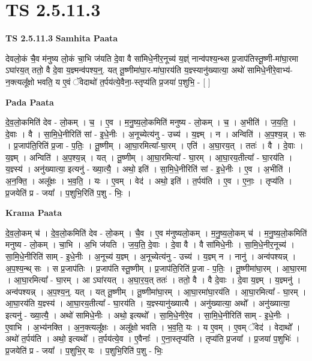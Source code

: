 \documentclass[17pt]{extarticle}
\begin{document}
\section{ TS 2.5.11.3 }

\textbf{TS 2.5.11.3 } \newline
\textbf{Samhita Paata} \newline

देवलो॒कं चै॒व म॑नुष्य लो॒कं चा॒भि ज॑यति दे॒वा वै सा॑मिधे॒नीर॒नूच्य॑ य॒ज्ञ्ं नान्व॑पश्य॒न्थ्स प्र॒जाप॑तिस्तू॒ष्णी-मा॑घा॒रमा ऽघा॑रय॒त् ततो॒ वै दे॒वा य॒ज्ञ्मन्व॑पश्य॒न्॒. यत् तू॒ष्णीमा॑घा॒र-मा॑घा॒रय॑ति य॒ज्ञ्स्यानु॑ख्यात्या॒ अथो॑ सामिधे॒नीरे॒वाभ्य॑-न॒क्त्यलू᳚क्षो भवति॒ य ए॒वं ॅवेदाथो॑ त॒र्पय॑त्ये॒वैना॒-स्तृप्य॑ति प्र॒जया॑ प॒शुभि॒ - [  ] \newline

\textbf{Pada Paata} \newline

दे॒व॒लो॒कमिति॑ देव - लो॒कम् । च॒ । ए॒व । म॒नु॒ष्य॒लो॒कमिति॑ मनुष्य - लो॒कम् । च॒ । अ॒भीति॑ । ज॒य॒ति॒ । दे॒वाः । वै । सा॒मि॒धे॒नीरिति॑ सां - इ॒धे॒नीः । अ॒नूच्येत्य॑नु - उच्य॑ । य॒ज्ञ्म् । न । अन्विति॑ । अ॒प॒श्य॒न्न् । सः । प्र॒जाप॑ति॒रिति॑ प्र॒जा - प॒तिः॒ । तू॒ष्णीम् । आ॒घा॒रमित्या᳚-घा॒रम् । एति॑ । अ॒घा॒रय॒त् । ततः॑ । वै । दे॒वाः । य॒ज्ञ्म् । अन्विति॑ । अ॒प॒श्य॒न्न् । यत् । तू॒ष्णीम् । आ॒घा॒रमित्या᳚ - घा॒रम् । आ॒घा॒रय॒तीत्या᳚ - घा॒रय॑ति । य॒ज्ञ्स्य॑ । अनु॑ख्यात्या॒ इत्यनु॑ - ख्या॒त्यै॒ । अथो॒ इति॑ । सा॒मि॒धे॒नीरिति॑ सां - इ॒धे॒नीः । ए॒व । अ॒भीति॑ । अ॒न॒क्ति॒ । अलू᳚क्षः । भ॒व॒ति॒ । यः । ए॒वम् । वेद॑ । अथो॒ इति॑ । त॒र्पय॑ति । ए॒व । ए॒नाः॒ । तृप्य॑ति । प्र॒जयेति॑ प्र - जया᳚ । प॒शुभि॒रिति॑ प॒शु - भिः॒ ।  \newline


\textbf{Krama Paata} \newline

दे॒व॒लो॒कम् च॑ । दे॒व॒लो॒कमिति॑ देव - लो॒कम् । चै॒व । ए॒व म॑नुष्यलो॒कम् । म॒नु॒ष्य॒लो॒कम् च॑ । म॒नु॒ष्य॒लो॒कमिति॑ मनुष्य - लो॒कम् । चा॒भि । अ॒भि ज॑यति । ज॒य॒ति॒ दे॒वाः । दे॒वा वै । वै सा॑मिधे॒नीः । सा॒मि॒धे॒नीर॒नूच्य॑ । सा॒मि॒धे॒नीरिति॑ साम् - इ॒धे॒नीः । अ॒नूच्य॑ य॒ज्ञ्म् । अ॒नूच्येत्य॑नु - उच्य॑ । य॒ज्ञ्म् न । नानु॑ । अन्व॑पश्यन्न् । अ॒प॒श्य॒न्थ् सः । स प्र॒जाप॑तिः । प्र॒जाप॑ति स्तू॒ष्णीम् । प्र॒जाप॑ति॒रिति॑ प्र॒जा - प॒तिः॒ । तू॒ष्णीमा॑घा॒रम् । आ॒घा॒रमा । आ॒घा॒रमित्या᳚ - घा॒रम् । आ ऽघा॑रयत् । अ॒घा॒र॒य॒त् ततः॑ । ततो॒ वै । वै दे॒वाः । दे॒वा य॒ज्ञ्म् । य॒ज्ञ्मनु॑ । अन्व॑पश्यन्न् । अ॒प॒श्य॒न्॒. यत् । यत् तू॒ष्णीम् । तू॒ष्णीमा॑घा॒रम् । आ॒घा॒रमा॑घा॒रय॑ति । आ॒घा॒रमित्या᳚ - घा॒रम् । आ॒घा॒रय॑ति य॒ज्ञ्स्य॑ । आ॒घा॒रय॒तीत्या᳚ - घा॒रय॑ति । य॒ज्ञ्स्यानु॑ख्यात्यै । अनु॑ख्यात्या॒ अथो᳚ । अनु॑ख्यात्या॒ इत्यनु॑ - ख्या॒त्यै॒ । अथो॑ सामिधे॒नीः । अथो॒ इत्यथो᳚ । सा॒मि॒धे॒नीरे॒व । सा॒मि॒धे॒नीरिति॑ साम् - इ॒धे॒नीः । ए॒वाभि । अ॒भ्य॑नक्ति । अ॒न॒क्त्यलू᳚क्षः । अलू᳚क्षो भवति । भ॒व॒ति॒ यः । य ए॒वम् । ए॒वम् ॅवेद॑ । वेदाथो᳚ । अथो॑ त॒र्पय॑ति । अथो॒ इत्यथो᳚ । त॒र्पय॑त्ये॒व । ए॒वैनाः᳚ । ए॒ना॒स्तृप्य॑ति । तृप्य॑ति प्र॒जया᳚ । प्र॒जया॑ प॒शुभिः॑ । प्र॒जयेति॑ प्र - जया᳚ । प॒शुभि॒र् यः । प॒शुभि॒रिति॑ प॒शु - भिः॒ \newline
\end{document}
